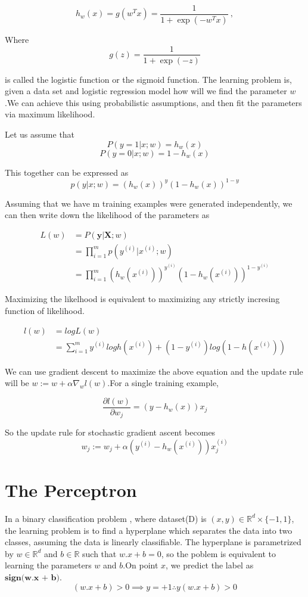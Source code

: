 \documentclass[12pt]{article}
\begin{document}
$$h_{w}(x) = g(w^{T}x) = \frac{1}{1 + \exp{(-w^{T}x)}} \ ,$$

Where $$g(z)= \frac{1}{1+ \exp{(-z)}}$$

is called the logistic function or the sigmoid function.
The learning problem is, given a data set and logistic regression model how will we find the parameter $w$.We can achieve this using probabilistic assumptions, and then fit the parameters via maximum likelihood.

Let us assume that 
$$P(y =1 \vert x;w) = h_{w}(x)$$
$$P(y =0 \vert  x;w) = 1 - h_{w}(x)$$

This together can be expressed as
 $$p(y \vert x;w) = (h_{w}(x))^{y}(1-h_{w}(x))^{1-y}$$
 
 Assuming that we have m training  examples were generated independently, we
 can then write down the likelihood of the parameters as
 
\begin{equation}
 \begin{split}
L(w) & = P(\textbf{y} \vert \textbf{X} ; w) \\
& = \prod_{i=1}^{m} p(y^{(i)} \vert x ^{(i)};w) \\
& = \prod_{i=1}^{m}  (h_{w}(x^{(i)}))^{y^{(i)}}(1-h_{w}(x^{(i)}))^{1-y^{(i)}} 
 \end{split}
\end{equation}


Maximizing the likelhood is equivalent to maximizing any strictly incresing function of likelihood.

\begin{equation}
\begin{split}
l(w) & = log L(w) \\ 
& = \sum_{i =1}^{m} y^{(i)} log h(x^{(i)}) + (1-y^{(i)}) log(1-h(x^{(i)}))
\end{split}
\end{equation}

We can use gradient descent to maximize the above equation and the update rule will be $w := w +\alpha \nabla _{w}l(w)$.For a single training example,




$$\frac{\partial l(w)}{\partial w_{j}} = (y - h_w(x))x_{j}   $$

So the update rule for stochastic gradient ascent becomes $$w_{j} := w_{j} +\alpha (y^{(i)} - h_w(x^{(i)}))x^{(i)}_{j}$$





\section{The Perceptron}
In a binary classification problem , where dataset(D) is  $(x,y) \in \mathbb{R}^{d} \times\{-1,1\}$, the  learning problem is to find a hyperplane which separates the data into two classes, 
 assuming the data is linearly classifiable. The hyperplane is parametrized by $w\in\mathbb{R}^{d}$ and $ b \in \mathbb{R}$ such that $w.x + b = 0 $, so the poblem is equivalent to learning  the parameters $w$ and $b$.On point $x$, we predict the label as $\textbf{sign(w.x + b)}$.\\
$$(w.x + b) > 0  \implies y = +1 \therefore y(w.x + b) > 0 $$
\end{document}
